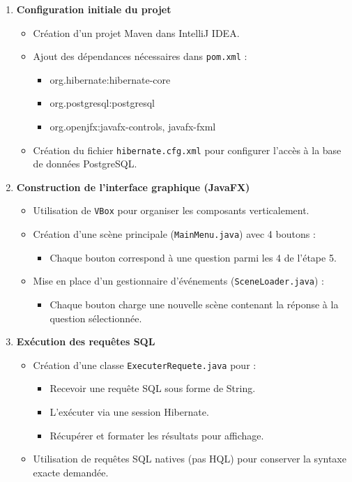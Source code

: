 \documentclass[12pt]{article}
\begin{document}
\begin{enumerate}
    \item \textbf{Configuration initiale du projet}
    \begin{itemize}
        \item Création d'un projet Maven dans IntelliJ IDEA.
        \item Ajout des dépendances nécessaires dans \texttt{pom.xml} :
        \begin{itemize}
            \item org.hibernate:hibernate-core
            \item org.postgresql:postgresql
            \item org.openjfx:javafx-controls, javafx-fxml
        \end{itemize}
        \item Création du fichier \texttt{hibernate.cfg.xml} pour configurer l'accès à la base de données PostgreSQL.
    \end{itemize}

    \item \textbf{Construction de l'interface graphique (JavaFX)}
    \begin{itemize}
        \item Utilisation de \texttt{VBox} pour organiser les composants verticalement.
        \item Création d'une scène principale (\texttt{MainMenu.java}) avec 4 boutons :
        \begin{itemize}
            \item Chaque bouton correspond à une question parmi les 4 de l'étape 5.
        \end{itemize}
        \item Mise en place d'un gestionnaire d'événements (\texttt{SceneLoader.java}) :
        \begin{itemize}
            \item Chaque bouton charge une nouvelle scène contenant la réponse à la question sélectionnée.
        \end{itemize}
    \end{itemize}

    \item \textbf{Exécution des requêtes SQL}
    \begin{itemize}
        \item Création d'une classe \texttt{ExecuterRequete.java} pour :
        \begin{itemize}
            \item Recevoir une requête SQL sous forme de String.
            \item L'exécuter via une session Hibernate.
            \item Récupérer et formater les résultats pour affichage.
        \end{itemize}
        \item Utilisation de requêtes SQL natives (pas HQL) pour conserver la syntaxe exacte demandée.
    \end{itemize}


\end{enumerate}
\end{document}
